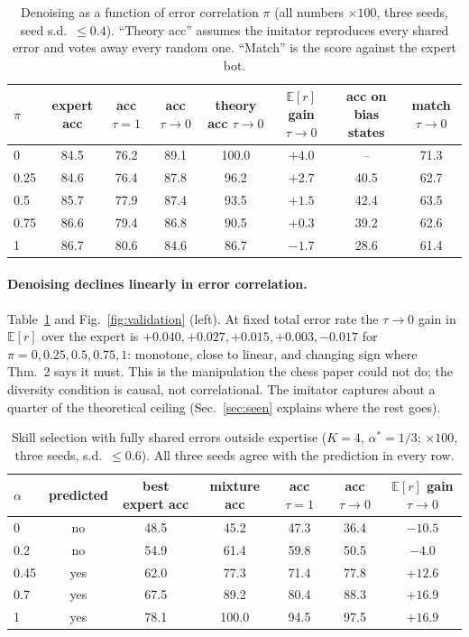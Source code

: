 \documentclass[11pt]{article}
\newcommand{\Er}{\mathbb{E}[r]}
\newcommand{\tauz}{\tau\!\to\!0}
\begin{document}
\begin{table}[t]
\centering\footnotesize
\begin{tabular}{lccccccc}
\toprule
$\pi$ & expert acc & acc $\tau{=}1$ & acc $\tauz$ & theory acc $\tauz$ & $\Er$ gain $\tauz$ & acc on bias states & match $\tauz$ \\
\midrule
0    & 84.5 & 76.2 & 89.1 & 100.0 & $+4.0$ & --   & 71.3 \\
0.25 & 84.6 & 76.4 & 87.8 & 96.2  & $+2.7$ & 40.5 & 62.7 \\
0.5  & 85.7 & 77.9 & 87.4 & 93.5  & $+1.5$ & 42.4 & 63.5 \\
0.75 & 86.6 & 79.4 & 86.8 & 90.5  & $+0.3$ & 39.2 & 62.6 \\
1    & 86.7 & 80.6 & 84.6 & 86.7  & $-1.7$ & 28.6 & 61.4 \\
\bottomrule
\end{tabular}
\caption{Denoising as a function of error correlation $\pi$ (all numbers $\times 100$, three seeds, seed s.d.\ $\le 0.4$). ``Theory acc'' assumes the imitator reproduces every shared error and votes away every random one. ``Match'' is the score against the expert bot.}
\label{tab:pi}
\end{table}

\paragraph{Denoising declines linearly in error correlation.} Table~\ref{tab:pi} and Fig.~\ref{fig:validation} (left). At fixed total error rate the $\tauz$ gain in $\Er$ over the expert is $+0.040,+0.027,+0.015,+0.003,-0.017$ for $\pi=0,0.25,0.5,0.75,1$: monotone, close to linear, and changing sign where Thm.~2 says it must. This is the manipulation the chess paper could not do; the diversity condition is causal, not correlational. The imitator captures about a quarter of the theoretical ceiling (Sec.~\ref{sec:seen} explains where the rest goes).

\begin{table}[t]
\centering\small
\begin{tabular}{lcccccc}
\toprule
$\alpha$ & predicted & best expert acc & mixture acc & acc $\tau{=}1$ & acc $\tauz$ & $\Er$ gain $\tauz$ \\
\midrule
0    & no  & 48.5 & 45.2  & 47.3 & 36.4 & $-10.5$ \\
0.2  & no  & 54.9 & 61.4  & 59.8 & 50.5 & $-4.0$ \\
0.45 & yes & 62.0 & 77.3  & 71.4 & 77.8 & $+12.6$ \\
0.7  & yes & 67.5 & 89.2  & 80.4 & 88.3 & $+16.9$ \\
1    & yes & 78.1 & 100.0 & 94.5 & 97.5 & $+16.9$ \\
\bottomrule
\end{tabular}
\caption{Skill selection with fully shared errors outside expertise ($K=4$, $\alpha^*=1/3$; $\times 100$, three seeds, s.d.\ $\le 0.6$). All three seeds agree with the prediction in every row.}
\label{tab:alpha}
\end{table}
\end{document}

